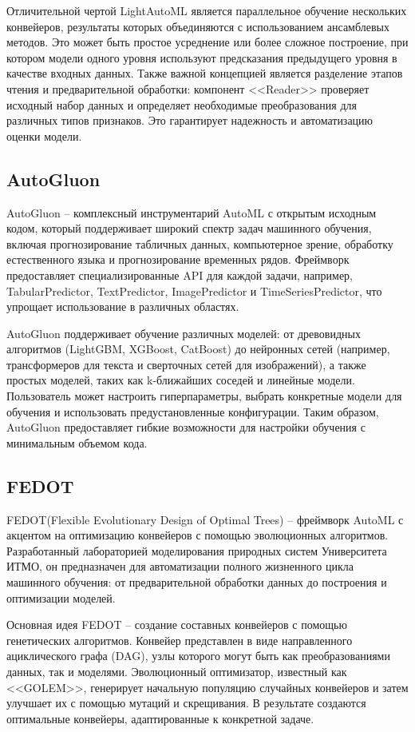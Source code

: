 \documentclass[14pt,a4paper,oneside,openany]{extbook}
\begin{document}
Отличительной чертой LightAutoML является параллельное обучение нескольких конвейеров, результаты которых объединяются с использованием ансамблевых методов. Это может быть простое усреднение или более сложное построение, при котором модели одного уровня используют предсказания предыдущего уровня в качестве входных данных. Также важной концепцией является разделение этапов чтения и предварительной обработки: компонент {}<<Reader>>{} проверяет исходный набор данных и определяет необходимые преобразования для различных типов признаков. Это гарантирует надежность и автоматизацию оценки модели.
\subsection{AutoGluon}
\label{sec:org7e37713}
AutoGluon -- комплексный инструментарий AutoML с открытым исходным кодом, который поддерживает широкий спектр задач машинного обучения, включая прогнозирование табличных данных, компьютерное зрение, обработку естественного языка и прогнозирование временных рядов. Фреймворк предоставляет специализированные API для каждой задачи, например, TabularPredictor, TextPredictor, ImagePredictor и TimeSeriesPredictor, что упрощает использование в различных областях.

AutoGluon поддерживает обучение различных моделей: от древовидных алгоритмов (LightGBM, XGBoost, CatBoost) до нейронных сетей (например, трансформеров для текста и сверточных сетей для изображений), а также простых моделей, таких как k-ближайших соседей и линейные модели. Пользователь может настроить гиперпараметры, выбрать конкретные модели для обучения и использовать предустановленные конфигурации. Таким образом, AutoGluon предоставляет гибкие возможности для настройки обучения с минимальным объемом кода.
\subsection{FEDOT}
\label{sec:org72f0b03}
FEDOT\autocites{nikitin_automated_2022}[][]{polonskaia_multiobjective_2021}(Flexible Evolutionary Design of Optimal Trees) -- фреймворк AutoML с акцентом на оптимизацию конвейеров с помощью эволюционных алгоритмов. Разработанный лабораторией моделирования природных систем Университета ИТМО, он предназначен для автоматизации полного жизненного цикла машинного обучения: от предварительной обработки данных до построения и оптимизации моделей.

Основная идея FEDOT -- создание составных конвейеров с помощью генетических алгоритмов. Конвейер представлен в виде направленного ациклического графа (DAG), узлы которого могут быть как преобразованиями данных, так и моделями. Эволюционный оптимизатор, известный как {}<<GOLEM>>{}, генерирует начальную популяцию случайных конвейеров и затем улучшает их с помощью мутаций и скрещивания. В результате создаются оптимальные конвейеры, адаптированные к конкретной задаче.
\end{document}
